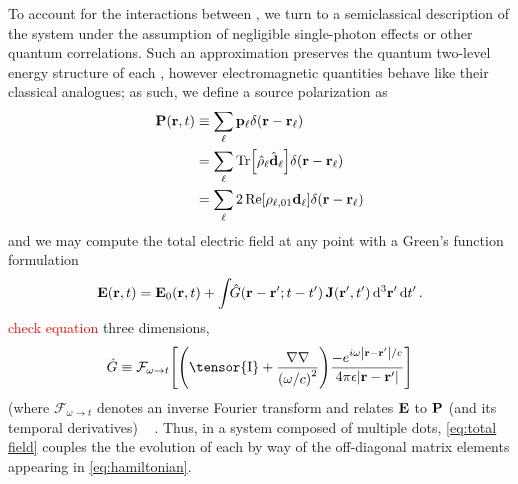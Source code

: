 To account for the interactions between \qds{}, we turn to a semiclassical description of the system under the assumption of negligible single-photon effects or other quantum correlations.
Such an approximation preserves the quantum two-level energy structure of each \qd{}, however electromagnetic quantities behave like their classical analogues;
as such, we define a source polarization as
\begin{equation}
  \begin{aligned}
    \vb{P}(\vb{r}, t) &\equiv \sum_\ell \vb{p}_\ell \delta(\vb{r} - \vb{r}_\ell) \\
                      &= \sum_\ell \Tr[\hat{\rho}_\ell \hat{\vb{d}}_\ell] \delta(\vb{r} - \vb{r}_\ell) \\
                      &= \sum_\ell 2 \Re[\rho_{\ell,01}\vb{d}_\ell]\delta(\vb{r} - \vb{r}_\ell) \\
  \end{aligned}
\end{equation}
and we may compute the total electric field at any point with a Green's function formulation
\begin{equation}
  \vb{E}(\vb{r}, t) = \vb{E}_0(\vb{r}, t) + \int \!\! \hat{G}(\vb{r} - \vb{r}'; t - t') \, \vb{J}(\vb{r}', t') \dd[3]{\vb{r}'} \dd{t'}.
  \label{eq:total field}
\end{equation}
\textcolor{red}{check equation} three dimensions,
\begin{equation}
  \hat{G} \equiv \mathcal{F}_{\omega \to t}\qty[ \qty(\tensor{\mathrm{I}} + \frac{\nabla \nabla}{\qty(\omega/c)^2})\frac{-e^{i \omega \abs{\vb{r} - \vb{r}'}/c}}{4\pi \epsilon \abs{\vb{r} - \vb{r}'}} ]
  \label{eq:dyadic}
\end{equation}
(where $\mathcal{F}_{\omega \to t}$ denotes an inverse Fourier transform and relates $\vb{E}$ to $\vb{P}$ (and its temporal derivatives) ~\cite{Shanker volume integral dispersive paper} \cite{Rothwell2009}. 
Thus, in a system composed of multiple dots, \cref{eq:total field} couples the the evolution of each \qd{} by way of the off-diagonal matrix elements appearing in \cref{eq:hamiltonian}.
